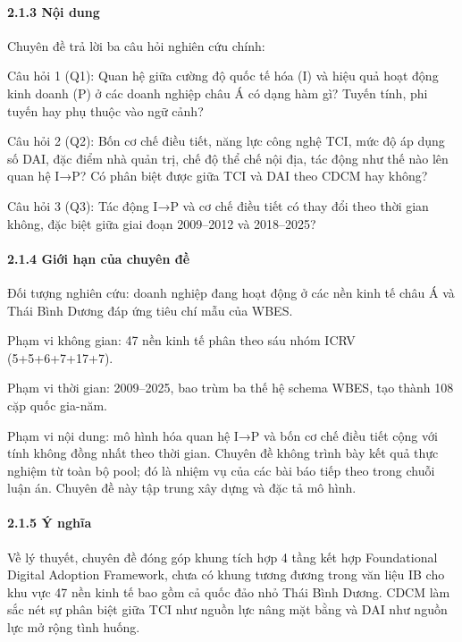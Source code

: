 \documentclass[12pt,a4paper]{article}
\begin{document}
\hypertarget{213-nux1ed9i-dung}{%
\paragraph{2.1.3 Nội dung}\label{213-nux1ed9i-dung}}

Chuyên đề trả lời ba câu hỏi nghiên cứu chính:

Câu hỏi 1 (Q1): Quan hệ giữa cường độ quốc tế hóa (I) và hiệu quả hoạt
động kinh doanh (P) ở các doanh nghiệp châu Á có dạng hàm gì? Tuyến
tính, phi tuyến hay phụ thuộc vào ngữ cảnh?

Câu hỏi 2 (Q2): Bốn cơ chế điều tiết, năng lực công nghệ TCI, mức độ áp
dụng số DAI, đặc điểm nhà quản trị, chế độ thể chế nội địa, tác động như
thế nào lên quan hệ I→P? Có phân biệt được giữa TCI và DAI theo CDCM hay
không?

Câu hỏi 3 (Q3): Tác động I→P và cơ chế điều tiết có thay đổi theo thời
gian không, đặc biệt giữa giai đoạn 2009--2012 và 2018--2025?

\hypertarget{214-giux1edbi-hux1ea1n-cux1ee7a-chuyuxean-ux111ux1ec1}{%
\paragraph{2.1.4 Giới hạn của chuyên
đề}\label{214-giux1edbi-hux1ea1n-cux1ee7a-chuyuxean-ux111ux1ec1}}

Đối tượng nghiên cứu: doanh nghiệp đang hoạt động ở các nền kinh tế châu
Á và Thái Bình Dương đáp ứng tiêu chí mẫu của WBES.

Phạm vi không gian: 47 nền kinh tế phân theo sáu nhóm ICRV
(5+5+6+7+17+7).

Phạm vi thời gian: 2009--2025, bao trùm ba thế hệ schema WBES, tạo thành
108 cặp quốc gia-năm.

Phạm vi nội dung: mô hình hóa quan hệ I→P và bốn cơ chế điều tiết cộng
với tính không đồng nhất theo thời gian. Chuyên đề không trình bày kết
quả thực nghiệm từ toàn bộ pool; đó là nhiệm vụ của các bài báo tiếp
theo trong chuỗi luận án. Chuyên đề này tập trung xây dựng và đặc tả mô
hình.

\hypertarget{215-uxfd-nghux129a}{%
\paragraph{2.1.5 Ý nghĩa}\label{215-uxfd-nghux129a}}

Về lý thuyết, chuyên đề đóng góp khung tích hợp 4 tầng kết hợp
Foundational Digital Adoption Framework, chưa có khung tương đương trong
văn liệu IB cho khu vực 47 nền kinh tế bao gồm cả quốc đảo nhỏ Thái Bình
Dương. CDCM làm sắc nét sự phân biệt giữa TCI như nguồn lực nâng mặt
bằng và DAI như nguồn lực mở rộng tình huống.
\end{document}
